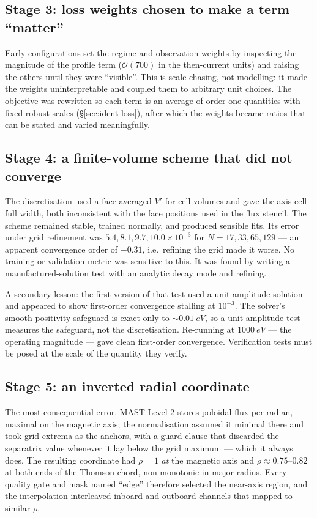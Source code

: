 \subsection{Stage 3: loss weights chosen to make a term ``matter''}
\label{app:hist-weights}

Early configurations set the regime and observation weights by inspecting
the magnitude of the profile term ($\mathcal{O}(700)$ in the then-current
units) and raising the others until they were ``visible''. This is
scale-chasing, not modelling: it made the weights uninterpretable and
coupled them to arbitrary unit choices. The objective was rewritten so each
term is an average of order-one quantities with fixed robust scales
(\S\ref{sec:ident-loss}), after which the weights became ratios that can be
stated and varied meaningfully.

\subsection{Stage 4: a finite-volume scheme that did not converge}
\label{app:hist-fvm}

The discretisation used a face-averaged $V'$ for cell volumes and gave the
axis cell full width, both inconsistent with the face positions used in the
flux stencil. The scheme remained stable, trained normally, and produced
sensible fits. Its error under grid refinement was $5.4, 8.1, 9.7,
10.0 \times 10^{-3}$ for $N = 17, 33, 65, 129$ --- an apparent convergence
order of $-0.31$, i.e.\ refining the grid made it worse. No training or
validation metric was sensitive to this. It was found by writing a
manufactured-solution test with an analytic decay mode and refining.

A secondary lesson: the first version of that test used a unit-amplitude
solution and appeared to show first-order convergence stalling at
$10^{-3}$. The solver's smooth positivity safeguard is exact only to
$\sim$$\SI{0.01}{eV}$, so a unit-amplitude test measures the safeguard, not
the discretisation. Re-running at $\SI{1000}{eV}$ --- the operating
magnitude --- gave clean first-order convergence. Verification tests must be
posed at the scale of the quantity they verify.

\subsection{Stage 5: an inverted radial coordinate}
\label{app:hist-rho}

The most consequential error. MAST Level-2 stores poloidal flux per radian,
maximal on the magnetic axis; the normalisation assumed it minimal there and
took grid extrema as the anchors, with a guard clause that discarded the
separatrix value whenever it lay below the grid maximum --- which it always
does. The resulting coordinate had $\rho = 1$ \emph{at} the magnetic axis
and $\rho \approx 0.75$--$0.82$ at both ends of the Thomson chord,
non-monotonic in major radius. Every quality gate and mask named ``edge''
therefore selected the near-axis region, and the interpolation interleaved
inboard and outboard channels that mapped to similar $\rho$.

